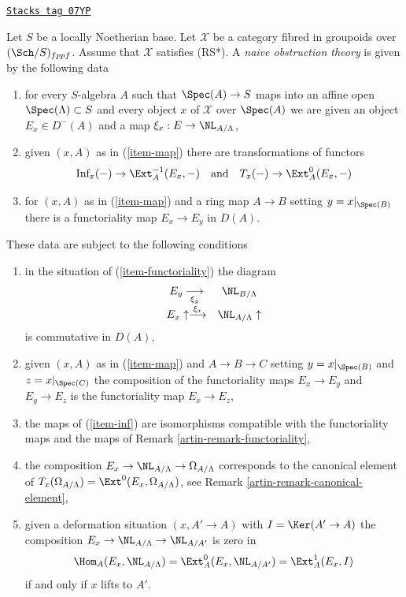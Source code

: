 \begin{definition}
\label{artin-definition-naive-obstruction-theory}
\href{https://stacks.math.columbia.edu/tag/07YP}{\texttt{Stacks tag 07YP}}

Let $S$ be a locally Noetherian base. Let $\mathcal{X}$ be a category fibred
in groupoids over $(\Sch/S)_{fppf}$. Assume that $\mathcal{X}$
satisfies (RS*). A {\it naive obstruction theory} is
given by the following data
\begin{enumerate}
\item
\label{artin-item-map}
for every $S$-algebra $A$ such that $\Spec(A) \to S$
maps into an affine open $\Spec(\Lambda) \subset S$ and every object $x$
of $\mathcal{X}$ over $\Spec(A)$ we are given an object $E_x \in D^-(A)$
and a map $\xi_x : E \to \NL_{A/\Lambda}$,
\item
\label{artin-item-inf}
given $(x, A)$ as in (\ref{item-map}) there are transformations of
functors
$$
\text{Inf}_x( - ) \to \Ext^{-1}_A(E_x, -)
\quad\text{and}\quad
T_x(-) \to \Ext^0_A(E_x, -)
$$
\item
\label{artin-item-functoriality}
for $(x, A)$ as in (\ref{item-map}) and a ring map $A \to B$
setting $y = x|_{\Spec(B)}$ there is a functoriality map
$E_x \to E_y$ in $D(A)$.
\end{enumerate}
These data are subject to the following conditions
\begin{enumerate}
\item[(i)]
in the situation of (\ref{item-functoriality}) the diagram
$$
\begin{array}{cc}E_y \underset{\xi_y}{\longrightarrow} & \NL_{B/\Lambda} \\ E_x \uparrow\overset{\xi_x}{\longrightarrow} & \NL_{A/\Lambda} \uparrow\end{array}
$$
is commutative in $D(A)$,
\item[(ii)]
given $(x, A)$ as in (\ref{item-map}) and $A \to B \to C$
setting $y = x|_{\Spec(B)}$ and $z = x|_{\Spec(C)}$ the
composition of the functoriality maps $E_x \to E_y$ and $E_y \to E_z$ is
the functoriality map $E_x \to E_z$,
\item[(iii)]
the maps of (\ref{item-inf}) are isomorphisms
compatible with the functoriality
maps and the maps of Remark \ref{artin-remark-functoriality},
\item[(iv)]
the composition $E_x \to \NL_{A/\Lambda} \to \Omega_{A/\Lambda}$
corresponds to the canonical element of
$T_x(\Omega_{A/\Lambda}) = \Ext^0(E_x, \Omega_{A/\Lambda})$, see
Remark \ref{artin-remark-canonical-element},
\item[(v)]
given a deformation situation $(x, A' \to A)$ with $I = \Ker(A' \to A)$
the composition $E_x \to \NL_{A/\Lambda} \to \NL_{A/A'}$ is zero in
$$
\Hom_A(E_x, \NL_{A/\Lambda}) = \Ext^0_A(E_x, \NL_{A/A'}) =
\Ext^1_A(E_x, I)
$$
if and only if $x$ lifts to $A'$.
\end{enumerate}
\end{definition}

